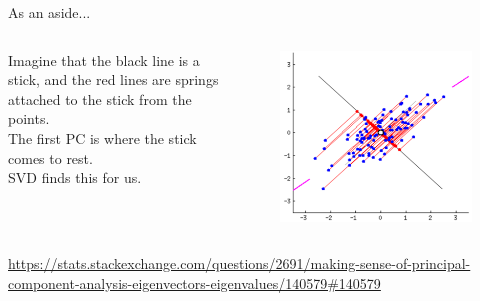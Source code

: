 \documentclass[aspectratio=169]{../latex_main/tntbeamer}  %
\begin{document}
	\begin{frame}{As an aside...}
	    \begin{columns}
	        \begin{column}{.4\textwidth}
	                Imagine that the black line is a stick, and the red lines are springs attached to the stick from the points.\\
	                \bigskip
	                The first PC is where the stick comes to rest.\\
	                \bigskip
                    SVD finds this for us.\\
                    
	        \end{column}
	        
	        
	        \begin{column}{.6\textwidth}
	                \begin{figure}
	                    \centering
	                    \includegraphics[scale=.25]{Bild19}
	                \end{figure}
	        \end{column}
	        
	        
	    \end{columns}
	    \url{https://stats.stackexchange.com/questions/2691/making-sense-of-principal-component-analysis-eigenvectors-eigenvalues/140579\#140579}

	\end{frame}
	
\end{document}
